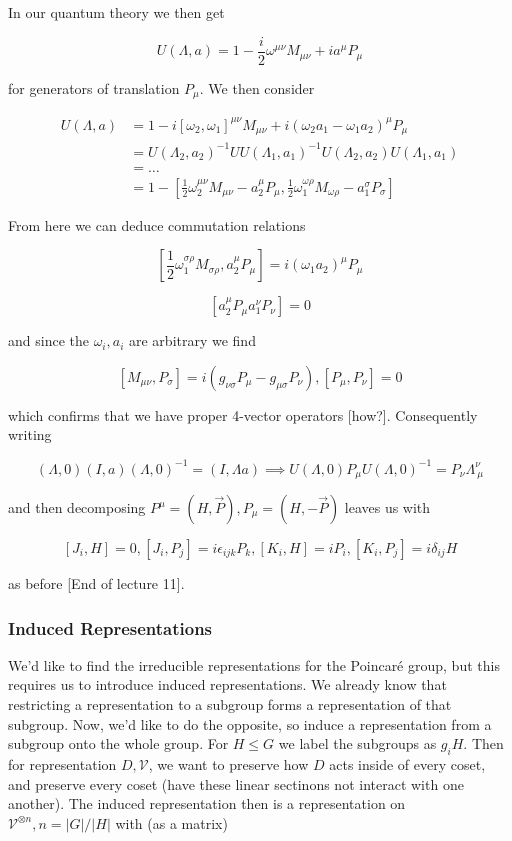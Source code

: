 \documentclass{article}
\theoremstyle{definition}
\begin{document}
In our quantum theory we then get

$$ U(\Lambda, a) = 1 - \frac{i}{2} \omega^{\mu \nu} M_{\mu \nu} + i a^\mu
P_\mu $$

for generators of translation $P_\mu$. We then consider

\begin{align*}
  U(\Lambda, a) &= 1 - i[\omega_2, \omega_1]^{\mu \nu} M_{\mu \nu} + i (\omega_2 a_1 - \omega_1 a_2)^\mu P_\mu \\
                &= U(\Lambda_2, a_2)^{-1} UU(\Lambda_1, a_1)^{-1} U(\Lambda_2, a_2) U(\Lambda_1, a_1) \\
                &= \dots \\
                &= 1 - [\frac{1}{2} \omega_2^{\mu \nu} M_{\mu \nu} - a_2^\mu P_\mu, \frac{1}{2} \omega_1^{\omega \rho} M_{\omega \rho} - a_1^\sigma P_\sigma]
\end{align*}

From here we can deduce commutation relations

$$ [\frac{1}{2} \omega_1^{\sigma \rho} M_{\sigma \rho}, a_2^\mu P_\mu] = i
(\omega_1 a_2)^{\mu} P_\mu $$

$$ [a_2^\mu P_\mu a_1^\nu P_\nu] = 0 $$

and since the $\omega_i, a_i$ are arbitrary we find

$$ [M_{\mu \nu}, P_\sigma] = i (g_{\nu \sigma} P_\mu - g_{\mu \sigma} P_\nu),
[P_\mu, P_\nu] = 0 $$

which confirms that we have proper 4-vector operators [how?]. Consequently
writing

$$ (\Lambda, 0) (I, a) (\Lambda, 0)^{-1} = (I, \Lambda a) \implies U(\Lambda, 0)
P_\mu U(\Lambda, 0)^{-1} = P_\nu \Lambda^\nu_{\ \mu} $$

and then decomposing $P^\mu = (H, \vec{P}), P_\mu = (H, -\vec{P})$ leaves us
with

$$ [J_i, H] = 0, [J_i, P_j] = i \epsilon_{ijk} P_k, [K_i, H] = iP_i, [K_i, P_j]
= i \delta_{ij} H $$

as before [End of lecture 11]. 

\subsubsection{Induced Representations}

We'd like to find the irreducible representations for the Poincar\'{e} group,
but this requires us to introduce induced representations. We already know that
restricting a representation to a subgroup forms a representation of that
subgroup. Now, we'd like to do the opposite, so induce a representation from a
subgroup onto the whole group. For $H \leq G$ we label the subgroups as $g_i H$.
Then for representation $D, \mathcal{V}$, we want to preserve how $D$ acts
inside of every coset, and preserve every coset (have these linear sectinons not
interact with one another). The induced representation then is a representation
on $\mathcal{V}^{\otimes n}, n = |G|/|H|$ with (as a matrix)
\end{document}
